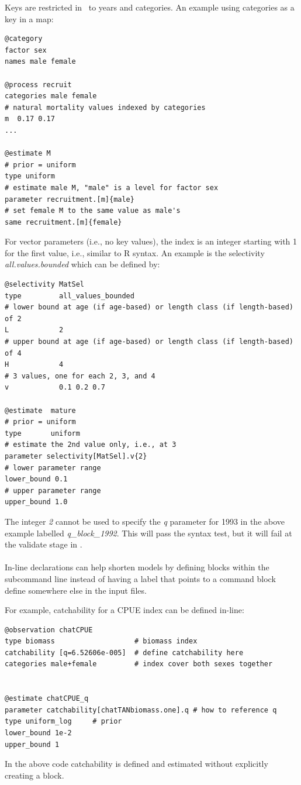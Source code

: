 Keys are restricted in \CNAME\ to years and categories. An example using categories as a key in a map:

{\small{\begin{verbatim}
@category
factor sex
names male female

@process recruit
categories male female
# natural mortality values indexed by categories
m  0.17 0.17
...

@estimate M
# prior = uniform
type uniform
# estimate male M, "male" is a level for factor sex
parameter recruitment.[m]{male}
# set female M to the same value as male's
same recruitment.[m]{female}
\end{verbatim}}}

For vector parameters (i.e., no key values), the index is an integer starting with 1 for the first value, i.e., similar to R syntax. An example is the selectivity \textit{all.values.bounded} which can be defined by:

{\small{\begin{verbatim}
@selectivity MatSel
type         all_values_bounded
# lower bound at age (if age-based) or length class (if length-based) of 2
L            2
# upper bound at age (if age-based) or length class (if length-based) of 4
H            4
# 3 values, one for each 2, 3, and 4
v            0.1 0.2 0.7

@estimate  mature
# prior = uniform
type       uniform
# estimate the 2nd value only, i.e., at 3
parameter selectivity[MatSel].v{2}
# lower parameter range
lower_bound 0.1
# upper parameter range
upper_bound 1.0
\end{verbatim}}}

The integer \textit{{2}} cannot be used to specify the \textit{q} parameter for 1993 in the above example labelled \textit{q\_block\_1992}. This will pass the syntax test, but it will fail at the validate stage in \CNAME.


\paragraph*{\label{sec:declare}}

In-line declarations can help shorten models by defining \command{} blocks within the subcommand line instead of having a label that points to a command block define somewhere else in the input files.

For example, catchability for a CPUE index can be defined in-line:

{\small{\begin{verbatim}
@observation chatCPUE
type biomass                   # biomass index
catchability [q=6.52606e-005]  # define catchability here
categories male+female         # index cover both sexes together


@estimate chatCPUE_q
parameter catchability[chatTANbiomass.one].q # how to reference q
type uniform_log     # prior
lower_bound 1e-2
upper_bound 1
\end{verbatim}}}

In the above code catchability is defined and estimated without explicitly creating a  block.


